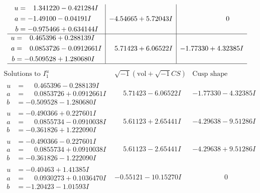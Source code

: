 \documentclass[1p]{elsarticle_modified}
\theoremstyle{definition}
\newcommand{\I}{\sqrt{-1}}
\begin{document}
$$\begin{array}{c|c|c}
\begin{aligned}
u &= \phantom{-}1.341220 - 0.421284 I \\
a &= -1.49100 - 0.04191 I \\
b &= -0.975466 + 0.634144 I\end{aligned}
 & -4.54665 + 5.72043 I & \phantom{-0.000000 } 0 \\ \hline\begin{aligned}
u &= \phantom{-}0.465396 + 0.288139 I \\
a &= \phantom{-}0.0853726 - 0.0912661 I \\
b &= -0.509528 + 1.280680 I\end{aligned}
 & \phantom{-}5.71423 + 6.06522 I & -1.77330 + 4.32385 I\\
 \hline 
 \end{array}$$\newpage$$\begin{array}{c|c|c}  
\text{Solutions to }I^u_{1}& \I (\text{vol} + \sqrt{-1}CS) & \text{Cusp shape}\\
 \hline 
\begin{aligned}
u &= \phantom{-}0.465396 - 0.288139 I \\
a &= \phantom{-}0.0853726 + 0.0912661 I \\
b &= -0.509528 - 1.280680 I\end{aligned}
 & \phantom{-}5.71423 - 6.06522 I & -1.77330 - 4.32385 I \\ \hline\begin{aligned}
u &= -0.490366 + 0.227601 I \\
a &= \phantom{-}0.0855734 - 0.0910038 I \\
b &= -0.361826 + 1.222090 I\end{aligned}
 & \phantom{-}5.61123 + 2.65441 I & -4.29638 - 9.51286 I \\ \hline\begin{aligned}
u &= -0.490366 - 0.227601 I \\
a &= \phantom{-}0.0855734 + 0.0910038 I \\
b &= -0.361826 - 1.222090 I\end{aligned}
 & \phantom{-}5.61123 - 2.65441 I & -4.29638 + 9.51286 I \\ \hline\begin{aligned}
u &= -0.40463 + 1.41385 I \\
a &= \phantom{-}0.0930273 + 0.1036470 I \\
b &= -1.20423 - 1.01593 I\end{aligned}
 & -0.55121 - 10.15270 I & \phantom{-0.000000 } 0 \\ \hline\begin{aligned}

\end{aligned}
\end{array}$$
\end{document}

